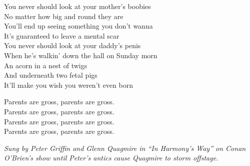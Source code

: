\vspace{10pt}
You never should look at your mother's boobies\\
No matter how big and round they are\\
You'll end up seeing something you don't wanna\\
It's guaranteed to leave a mental scar\\
You never should look at your daddy's penis\\
When he's walkin' down the hall on Sunday morn\\
An acorn in a nest of twigs\\
And underneath two fetal pigs\\
It'll make you wish you weren't even born\par
\vspace{10pt}
Parents are gross, parents are gross.\\
Parents are gross, parents are gross.\\
Parents are gross, parents are gross.\\
Parents are gross, parents are gross.\par
\vspace{10pt}
{\footnotesize\textit{Sung by Peter Griffin and Glenn Quagmire in ``In Harmony's Way'' on Conan O'Brien's show until Peter's antics cause Quagmire to storm offstage.}}
